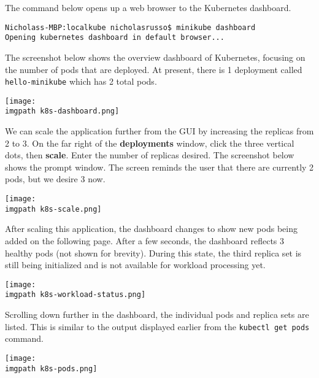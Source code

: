 The command below opens up a web browser to the Kubernetes dashboard.

\begin{verbatim}
Nicholass-MBP:localkube nicholasrusso$ minikube dashboard
Opening kubernetes dashboard in default browser...
\end{verbatim}

The screenshot below shows the overview dashboard of Kubernetes, focusing on
the number of pods that are deployed. At present, there is 1 deployment called
\verb|hello-minikube| which has 2 total pods.

    \begin{minipage}[t]{\linewidth}
	  \centering
      \texttt{[image: \\imgpath k8s-dashboard.png]}
    \end{minipage}

We can scale the application further from the GUI by increasing the replicas
from 2 to 3. On the far right of the \textbf{deployments} window, click the
three vertical dots, then \textbf{scale}. Enter the number of replicas
desired. The screenshot below shows the prompt window. The screen reminds the
user that there are currently 2 pods, but we desire 3 now.

    \begin{minipage}[t]{\linewidth}
	  \centering
      \texttt{[image: \\imgpath k8s-scale.png]}
    \end{minipage}

After scaling this application, the dashboard changes to show new pods being
added on the following page. After a few seconds, the dashboard reflects 3
healthy pods (not shown for brevity). During this state, the third replica set
is still being initialized and is not available for workload processing yet.

    \begin{minipage}[t]{\linewidth}
	  \centering
      \texttt{[image: \\imgpath k8s-workload-status.png]}
    \end{minipage}

Scrolling down further in the dashboard, the individual pods and replica sets
are listed. This is similar to the output displayed earlier from the
\verb|kubectl get pods| command.

    \begin{minipage}[t]{\linewidth}
	  \centering
      \texttt{[image: \\imgpath k8s-pods.png]}
    \end{minipage}

